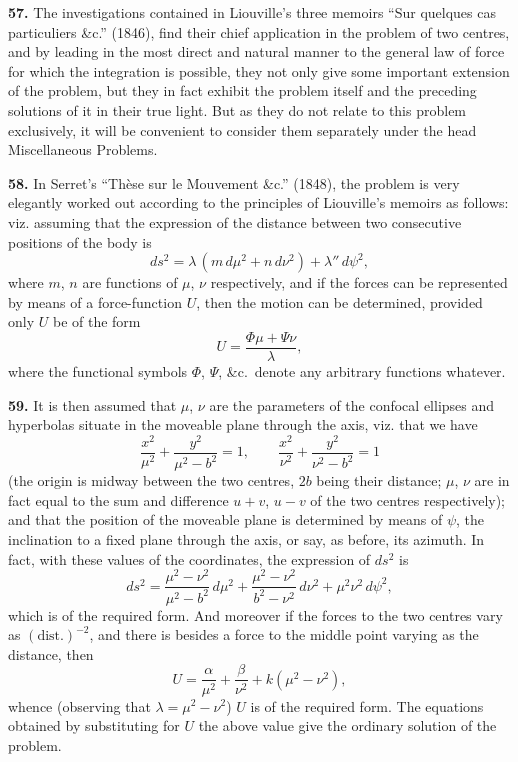 \documentclass[11pt,a4paper]{article}
\theoremstyle{definition}
\begin{document}

\textbf{57.} The investigations contained in Liouville's three memoirs ``Sur quelques cas particuliers \&c.'' (1846), find their chief application in the problem of two centres, and by leading in the most direct and natural manner to the general law of force for which the integration is possible, they not only give some important extension of the problem, but they in fact exhibit the problem itself and the preceding solutions of it in their true light. But as they do not relate to this problem exclusively, it will be convenient to consider them separately under the head Miscellaneous Problems.

\textbf{58.} In Serret's ``Th\`ese sur le Mouvement \&c.'' (1848), the problem is very elegantly worked out according to the principles of Liouville's memoirs as follows: viz. assuming that the expression of the distance between two consecutive positions of the body is
\[
ds^2 = \lambda\,(m\,d\mu^2 + n\,d\nu^2) + \lambda''\,d\psi^2,
\]
where $m$, $n$ are functions of $\mu$, $\nu$ respectively, and if the forces can be represented by means of a force-function $U$, then the motion can be determined, provided only $U$ be of the form
\[
U = \frac{\Phi\mu + \Psi\nu}{\lambda},
\]
where the functional symbols $\Phi$, $\Psi$, \&c.\ denote any arbitrary functions whatever.

\textbf{59.} It is then assumed that $\mu$, $\nu$ are the parameters of the confocal ellipses and hyperbolas situate in the moveable plane through the axis, viz. that we have
\[
\frac{x^2}{\mu^2} + \frac{y^2}{\mu^2 - b^2} = 1, \qquad \frac{x^2}{\nu^2} + \frac{y^2}{\nu^2 - b^2} = 1
\]
(the origin is midway between the two centres, $2b$ being their distance; $\mu$, $\nu$ are in fact equal to the sum and difference $u+v$, $u-v$ of the two centres respectively); and that the position of the moveable plane is determined by means of $\psi$, the inclination to a fixed plane through the axis, or say, as before, its azimuth. In fact, with these values of the coordinates, the expression of $ds^2$ is
\[
ds^2 = \frac{\mu^2 - \nu^2}{\mu^2 - b^2} \, d\mu^2 + \frac{\mu^2 - \nu^2}{b^2 - \nu^2} \, d\nu^2 + \mu^2\nu^2 \, d\psi^2,
\]
which is of the required form. And moreover if the forces to the two centres vary as $(\text{dist.})^{-2}$, and there is besides a force to the middle point varying as the distance, then
\[
U = \frac{\alpha}{\mu^2} + \frac{\beta}{\nu^2} + k(\mu^2 - \nu^2),
\]
whence (observing that $\lambda = \mu^2 - \nu^2$) $U$ is of the required form. The equations obtained by substituting for $U$ the above value give the ordinary solution of the problem.
\end{document}

